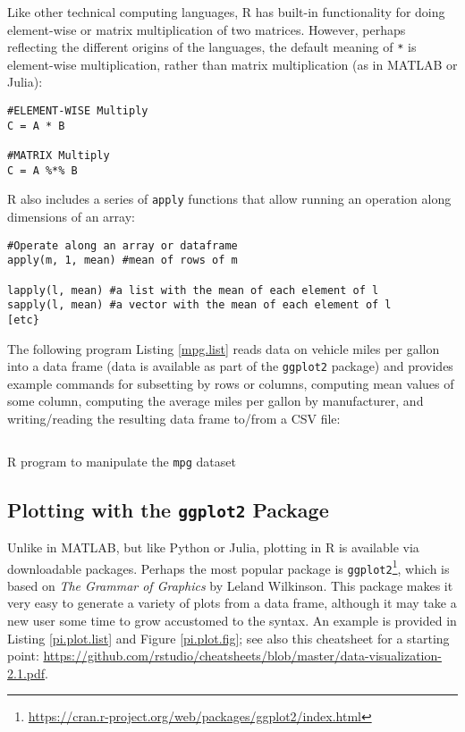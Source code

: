 Like other technical computing languages, R has built-in functionality for doing element-wise or matrix multiplication of two matrices. However, perhaps reflecting the different origins of the languages, the default meaning of \texttt{*} is element-wise multiplication, rather than matrix multiplication (as in MATLAB or Julia):
\begin{verbatim}
#ELEMENT-WISE Multiply
C = A * B

#MATRIX Multiply
C = A %*% B
\end{verbatim}

R also includes a series of \texttt{apply} functions that allow running an operation along dimensions of an array:
\begin{verbatim}
#Operate along an array or dataframe
apply(m, 1, mean) #mean of rows of m

lapply(l, mean) #a list with the mean of each element of l
sapply(l, mean) #a vector with the mean of each element of l
[etc}
\end{verbatim}

The following program Listing \ref{mpg.list} reads data on vehicle miles per gallon into a data frame (data is available as part of the \texttt{ggplot2} package) and provides example commands for subsetting by rows or columns, computing mean values of some column, computing the average miles per gallon by manufacturer, and writing/reading the resulting data frame to/from a CSV file:
%
\begin{listing}[ht]
\inputminted{R}{code/L22/mpg.r}
\caption{R program to manipulate the \texttt{mpg} dataset}
\label{mpg.list}
\end{listing}

\subsection{Plotting with the \texttt{ggplot2} Package}
Unlike in MATLAB, but like Python or Julia, plotting in R is available via downloadable packages. Perhaps the most popular package is \texttt{ggplot2}\footnote{\url{https://cran.r-project.org/web/packages/ggplot2/index.html}}, which is based on \textit{The Grammar of Graphics} by Leland Wilkinson. This package makes it very easy to generate a variety of plots from a data frame, although it may take a new user some time to grow accustomed to the syntax. An example is provided in Listing \ref{pi.plot.list} and Figure \ref{pi.plot.fig}; see also this cheatsheet for a starting point: \url{https://github.com/rstudio/cheatsheets/blob/master/data-visualization-2.1.pdf}.

